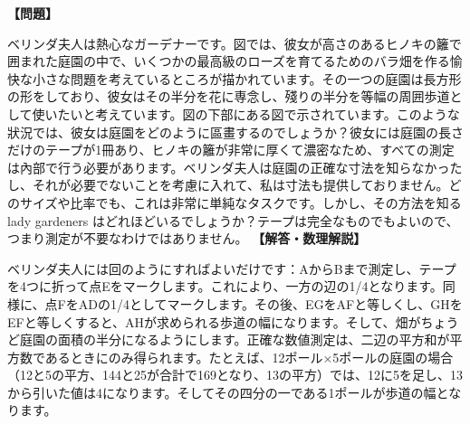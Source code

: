 \documentclass[10pt,a4paper,oneside,openany]{ltjsbook}
\begin{document}
\begin{tcolorbox}[colback=softblue,colframe=primaryblue,title=\textbf{第 195 問：ベリンダ夫人の庭園 （原題: LADY BELINDA'S GARDEN.）},arc=2mm,boxrule=1pt,breakable]
\textbf{【問題】}\par\vspace{0.3em}
ベリンダ夫人は熱心なガーデナーです。図では、彼女が高さのあるヒノキの籬で囲まれた庭園の中で、いくつかの最高級のローズを育てるためのバラ畑を作る愉快な小さな問題を考えているところが描かれています。その一つの庭園は長方形の形をしており、彼女はその半分を花に専念し、殘りの半分を等幅の周囲歩道として使いたいと考えています。図の下部にある図で示されています。このような狀況では、彼女は庭園をどのように區畫するのでしょうか？彼女には庭園の長さだけのテープが1冊あり、ヒノキの籬が非常に厚くて濃密なため、すべての測定は內部で行う必要があります。ベリンダ夫人は庭園の正確な寸法を知らなかったし、それが必要でないことを考慮に入れて、私は寸法も提供しておりません。どのサイズや比率でも、これは非常に単純なタスクです。しかし、その方法を知る lady gardeners はどれほどいるでしょうか？テープは完全なものでもよいので、つまり測定が不要なわけではありません。
\tcblower
\textbf{【解答・数理解説】}\par\vspace{0.3em}
ベリンダ夫人には回のようにすればよいだけです：AからBまで測定し、テープを4つに折って点Eをマークします。これにより、一方の辺の1/4となります。同様に、点FをADの1/4としてマークします。その後、EGをAFと等しくし、GHをEFと等しくすると、AHが求められる歩道の幅になります。そして、畑がちょうど庭園の面積の半分になるようにします。正確な数値測定は、二辺の平方和が平方数であるときにのみ得られます。たとえば、12ポール×5ポールの庭園の場合（12と5の平方、144と25が合計で169となり、13の平方）では、12に5を足し、13から引いた値は4になります。そしてその四分の一である1ポールが歩道の幅となります。
\end{tcolorbox}
\end{document}
